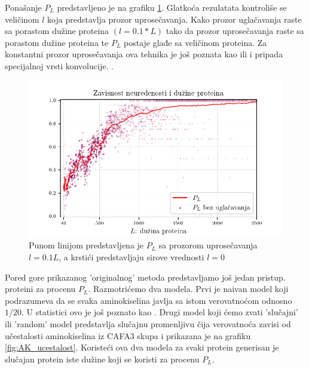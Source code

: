Ponašanje $P_L$ predstavljeno je na grafiku \ref{fig:PL1}. Glatkoća rezulatata
kontroliše se veličinom $l$ koja predstavlja prozor uprosečavanja. Kako prozor
uglačavanja raste sa porastom dužine proteina $(l = 0.1*L)$
tako da prozor uprosečavanja raste sa porastom dužine proteina te $P_L$
postaje glađe sa veličinom proteina. Za konstantni prozor uprosečavanja ova
tehnika je još poznata kao  ili  i
pripada specijalnoj vrsti konvolucije. .


\begin{figure}[th]
\centering
\includegraphics[]{plots/PL_F}
\decoRule
\caption {
 Punom linijom predstavljena je $P_L$ sa prozorom uprosečavanja $l = 0.1L$,
 a krstići predstavljaju sirove vrednosti $l = 0$ 
}
\label{fig:PL1}
\end{figure}


Pored gore prikazanog 'originalnog' metoda predstavljamo još jedan pristup.
  proteini za procenu $P_L$.
Razmotrićemo dva modela. Prvi je naivan model 
koji podrazumeva da se svaka aminokiselina javlja sa istom verovatnoćom odnosno
$1/20$. U statistici ovo je još poznato kao .  Drugi
model koji ćemo zvati 'slučajni' ili 'random' model predstavlja slučajnu
promenljivu čija verovatnoća zavisi od učestalosti aminokiselina iz CAFA3 skupa
i prikazana je na grafiku \ref{fig:AK_ucestalost}.  Koristeći ova dva modela za
svaki protein generisan je slučajan protein iste dužine koji se koristi za
procenu $P_L$.


